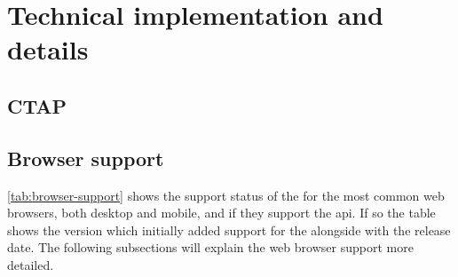 \section{Technical implementation and details}

\subsection{CTAP}

\newpage
\subsection{Browser support}

\autoref{tab:browser-support} shows the support status of the \wa{} for the most common web browsers, both desktop and mobile, and if they support the \gls{api}. If so the table shows the version which initially added support for the \wa{} alongside with the release date. The following subsections will explain the web browser support more detailed.

